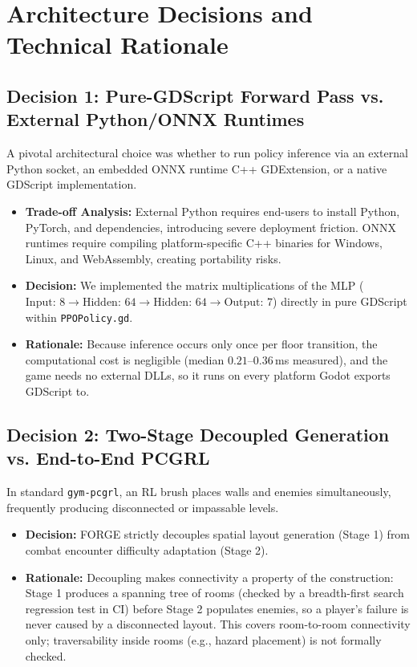 \section{Architecture Decisions and Technical Rationale}

\subsection{Decision 1: Pure-GDScript Forward Pass vs. External Python/ONNX Runtimes}
A pivotal architectural choice was whether to run policy inference via an external Python socket, an embedded ONNX runtime C++ GDExtension, or a native GDScript implementation.
\begin{itemize}
    \item \textbf{Trade-off Analysis:} External Python requires end-users to install Python, PyTorch, and dependencies, introducing severe deployment friction. ONNX runtimes require compiling platform-specific C++ binaries for Windows, Linux, and WebAssembly, creating portability risks.
    \item \textbf{Decision:} We implemented the matrix multiplications of the MLP ($\text{Input: 8} \rightarrow \text{Hidden: 64} \rightarrow \text{Hidden: 64} \rightarrow \text{Output: 7}$) directly in pure GDScript within \texttt{PPOPolicy.gd}.
    \item \textbf{Rationale:} Because inference occurs only once per floor transition, the computational cost is negligible (median $0.21$--$0.36$\,ms measured), and the game needs no external DLLs, so it runs on every platform Godot exports GDScript to.
\end{itemize}

\subsection{Decision 2: Two-Stage Decoupled Generation vs. End-to-End PCGRL}
In standard \texttt{gym-pcgrl}, an RL brush places walls and enemies simultaneously, frequently producing disconnected or impassable levels.
\begin{itemize}
    \item \textbf{Decision:} FORGE strictly decouples spatial layout generation (Stage 1) from combat encounter difficulty adaptation (Stage 2).
    \item \textbf{Rationale:} Decoupling makes connectivity a property of the construction: Stage 1 produces a spanning tree of rooms (checked by a breadth-first search regression test in CI) before Stage 2 populates enemies, so a player's failure is never caused by a disconnected layout. This covers room-to-room connectivity only; traversability inside rooms (e.g., hazard placement) is not formally checked.
\end{itemize}

